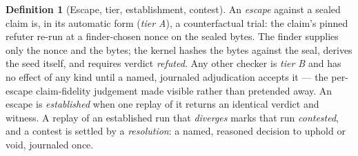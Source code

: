 \documentclass[11pt,a4paper]{article}
\theoremstyle{plain}
\theoremstyle{definition}
\newtheorem{definition}{Definition}
\theoremstyle{remark}
\begin{document}
\begin{definition}[Escape, tier, establishment, contest]
An \emph{escape} against a sealed claim is, in its automatic form (\emph{tier A}), a counterfactual trial: the claim's pinned refuter re-run at a finder-chosen nonce on the sealed bytes. The finder supplies only the nonce and the bytes; the kernel hashes the bytes against the seal, derives the seed itself, and requires verdict \emph{refuted}. Any other checker is \emph{tier B} and has no effect of any kind until a named, journaled adjudication accepts it --- the per-escape claim-fidelity judgement made visible rather than pretended away. An escape is \emph{established} when one replay of it returns an identical verdict and witness. A replay of an established run that \emph{diverges} marks that run \emph{contested}, and a contest is settled by a \emph{resolution}: a named, reasoned decision to uphold or void, journaled once.
\end{definition}
\end{document}
